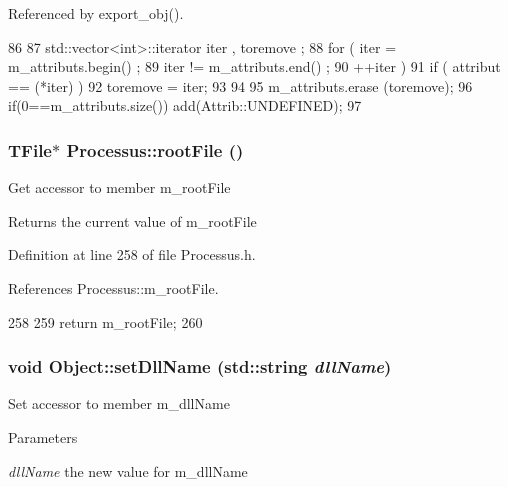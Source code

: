 Referenced by export\_\-obj().


\begin{DoxyCode}
86                                {
87     std::vector<int>::iterator iter , toremove ;
88     for ( iter  = m_attributs.begin() ;
89           iter != m_attributs.end()   ;
90           ++iter ) {
91       if ( attribut == (*iter) ) {
92         toremove = iter;
93       }
94     }
95     m_attributs.erase (toremove);
96     if(0==m_attributs.size()) add(Attrib::UNDEFINED);
97   }
\end{DoxyCode}
\hypertarget{classProcessus_a247e8c362ec08422cf53d08dd23b093c}{
\subsubsection[{rootFile}]{\setlength{\rightskip}{0pt plus 5cm}TFile$\ast$ Processus::rootFile ()}}
\label{classProcessus_a247e8c362ec08422cf53d08dd23b093c}
Get accessor to member m\_\-rootFile \begin{DoxyReturn}{Returns}
the current value of m\_\-rootFile 
\end{DoxyReturn}


Definition at line 258 of file Processus.h.

References Processus::m\_\-rootFile.


\begin{DoxyCode}
258                      {
259     return m_rootFile;
260   }
\end{DoxyCode}
\hypertarget{classObject_a870c5af919958c2136623b2d7816d123}{
\subsubsection[{setDllName}]{\setlength{\rightskip}{0pt plus 5cm}void Object::setDllName (std::string {\em dllName})}}
\label{classObject_a870c5af919958c2136623b2d7816d123}
Set accessor to member m\_\-dllName 
\begin{DoxyParams}{Parameters}
\item[{\em dllName}]the new value for m\_\-dllName \end{DoxyParams}


